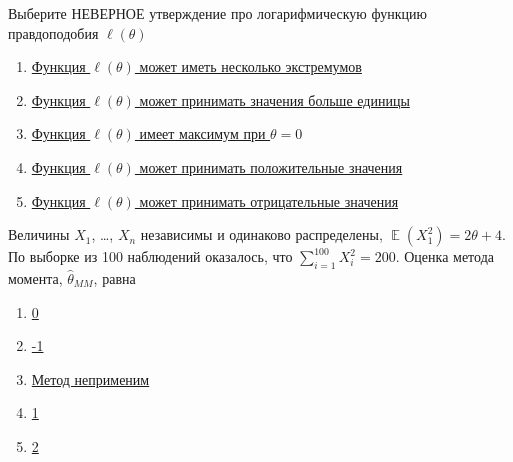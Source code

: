 \documentclass[t]{beamer}
\DeclareMathOperator{\E}{\mathbb{E}}
\begin{document}
 \begin{frame} \label{35} 
\begin{block}{35} 

 Выберите НЕВЕРНОЕ утверждение про логарифмическую функцию правдоподобия $\ell(\theta)$


 \end{block} 
\begin{enumerate} 
\item[] \hyperlink{35-No}{\beamergotobutton{} Функция $\ell(\theta)$ может иметь несколько экстремумов}
\item[] \hyperlink{35-No}{\beamergotobutton{} Функция $\ell(\theta)$ может принимать значения больше единицы}
\item[] \hyperlink{35-Yes}{\beamergotobutton{} Функция $\ell(\theta)$ имеет максимум при $\theta=0$}
\item[] \hyperlink{35-No}{\beamergotobutton{} Функция $\ell(\theta)$ может принимать положительные значения}
\item[] \hyperlink{35-No}{\beamergotobutton{} Функция $\ell(\theta)$ может принимать отрицательные значения}
\end{enumerate} 
\end{frame} 


 \begin{frame} \label{36} 
\begin{block}{36} 

Величины $X_1$, \ldots, $X_n$ независимы и одинаково распределены, $\E(X_1^2)=2\theta + 4$. По выборке из 100 наблюдений оказалось, что $\sum_{i=1}^{100} X_i^2 = 200$. Оценка метода момента, $\hat\theta_{MM}$, равна


 \end{block} 
\begin{enumerate} 
\item[] \hyperlink{36-No}{\beamergotobutton{} 0}
\item[] \hyperlink{36-Yes}{\beamergotobutton{} -1}
\item[] \hyperlink{36-No}{\beamergotobutton{} Метод неприменим}
\item[] \hyperlink{36-No}{\beamergotobutton{} 1}
\item[] \hyperlink{36-No}{\beamergotobutton{} 2}
\end{enumerate} 
\end{frame} 
\end{document}
